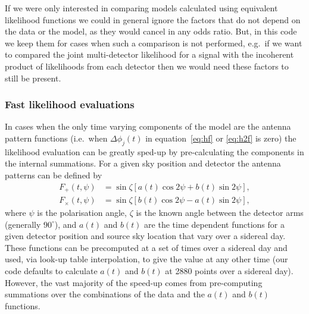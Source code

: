 If we were only interested in comparing models calculated using equivalent likelihood functions we could in
general ignore the factors that do not depend on the data or the model, as they would cancel in any odds
ratio. But, in this code we keep them for cases when such a comparison is not performed, e.g.\ if we
want to compared the joint multi-detector likelihood for a signal with the incoherent product of likelihoods
from each detector then we would need these factors to still be present.

\subsubsection{Fast likelihood evaluations}\label{sec:fastlike}

In cases when the only time varying components of the model are the antenna pattern functions (i.e.\ when 
$\Delta \phi_j(t)$ in equation~\ref{eq:hf} or \ref{eq:h2f} is zero) the likelihood
evaluation can be greatly sped-up by pre-calculating the components in the internal summations. For a given sky
position and detector the antenna patterns can be defined by \citep{1998PhRvD..58f3001J}
\begin{align}\label{eq:antenna}
F_+(t,\psi) &= \sin{\zeta}\left[a(t)\cos{2\psi} + b(t)\sin{2\psi}\right], \nonumber \\
F_{\times}(t,\psi) &= \sin{\zeta}\left[b(t)\cos{2\psi} - a(t)\sin{2\psi}\right],
\end{align}
where $\psi$ is the \gw polarisation angle, $\zeta$ is the known angle between the detector arms (generally
$90^{\circ}$), and $a(t)$ and $b(t)$ are the time dependent functions for a given detector position and
source sky location that vary over a sidereal day. These functions can be precomputed at a set of times over
a sidereal day and used, via look-up table interpolation, to give the value at any other time (our code
defaults to calculate $a(t)$ and $b(t)$ at 2880 points over a sidereal day). However, the vast majority of the
speed-up comes from pre-computing summations over the combinations of the data and the $a(t)$ and $b(t)$ functions.

